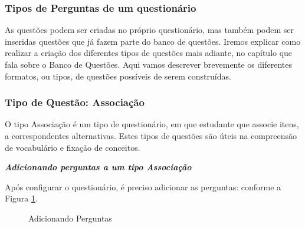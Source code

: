 \subsubsection{Tipos de Perguntas de um questionário}
As questões podem ser criadas no próprio questionário, mas também podem ser inseridas questões que já fazem parte do banco de questões. Iremos explicar como realizar a criação dos diferentes tipos de questões mais adiante, no capítulo que fala sobre o Banco de Questões. Aqui vamos descrever brevemente os diferentes formatos, ou tipos, de questões possíveis de serem construídas.
\subsubsection{Tipo de Questão: Associação}
O tipo Associação é um tipo de questionário, em que estudante que associe itens, a correspondentes alternativas. Estes tipos de questões são úteis na compreensão de vocabulário e fixação de conceitos.

 \textit{\textbf{Adicionando perguntas a um tipo Associação}}

Após configurar o questionário, é preciso adicionar as perguntas: conforme a Figura \ref{fig:cap5_23}.

\begin{figure}[htbp]
 \begin{center}
  \caption{Adicionando Perguntas}
  \label{fig:cap5_23}
 \end{center}
\end{figure}

